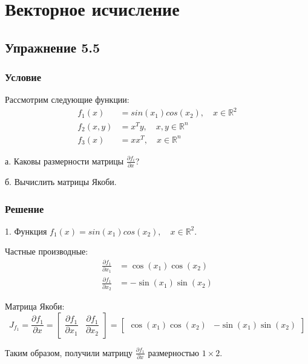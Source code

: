 \documentclass{article}
\begin{document}
\section*{Векторное исчисление}

\subsection*{Упражнение 5.5}

\subsubsection*{Условие}

Рассмотрим следующие функции:
\begin{align*}
f_1(x) &= sin(x_1) cos(x_2), \quad x \in \mathbb{R}^2 \\
f_2(x, y) &= x^T y, \quad x, y \in \mathbb{R}^n \\
f_3(x) &= x x^T, \quad x \in \mathbb{R}^n
\end{align*}

а. Каковы размерности матрицы \(\frac{\partial f_i}{\partial x}\)?

б. Вычислить матрицы Якоби.

\subsubsection*{Решение}

1. Функция \( f_1(x) = sin(x_1) cos(x_2), \quad x \in \mathbb{R}^2 \).

\quad

Частные производные:
\begin{align*}
\frac{\partial f_1}{\partial x_1} &= \cos(x_1)\cos(x_2) \\
\frac{\partial f_1}{\partial x_2} &= -\sin(x_1)\sin(x_2)
\end{align*}

Матрица Якоби:
\[
J_{f_1} = \frac{\partial f_1}{\partial x} = \begin{bmatrix}
\dfrac{\partial f_1}{\partial x_1} & \dfrac{\partial f_1}{\partial x_2}
\end{bmatrix} = \begin{bmatrix}
\cos(x_1)\cos(x_2) & -\sin(x_1)\sin(x_2)
\end{bmatrix}
\]

Таким образом, получили матрицу \(\frac{\partial f_1}{\partial x}\) размерностью \(1 \times 2\).

\quad
\end{document}

